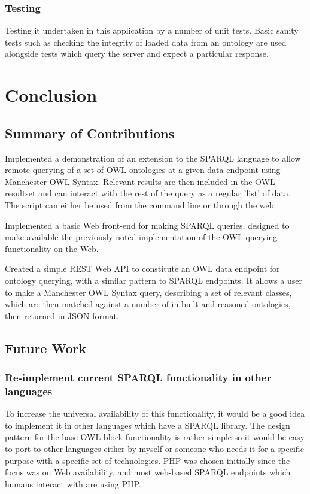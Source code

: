 \documentclass{article}
\begin{document}
\subsubsection{Testing}

Testing it undertaken in this application by a number of unit tests. Basic
sanity tests such as checking the integrity of loaded data from an ontology are
used alongside tests which query the server and expect a particular response.

\section{Conclusion}

\subsection{Summary of Contributions}

Implemented a demonstration of an extension to the SPARQL language to allow
remote querying of a set of OWL ontologies at
a given data endpoint using Manchester OWL Syntax. Relevant results are then
included in the OWL resultset and can
interact with the rest of the query as a regular 'list' of data. The script can
either be used from the command line or
through the web.

Implemented a basic Web front-end for making SPARQL queries, designed to make
available the previously noted implementation of
the OWL querying functionality on the Web.

Created a simple REST Web API to constitute an OWL data endpoint for ontology
querying, with a similar pattern to SPARQL
endpoints. It allows a user to make a Manchester OWL Syntax query, describing a
set of relevant classes, which are then
matched against a number of in-built and reasoned ontologies, then returned in
JSON format.

\subsection{Future Work}

\subsubsection{Re-implement current SPARQL functionality in other languages}

To increase the universal availability of this functionality, it would be a good
idea to implement it in other languages which
have a SPARQL library. The design pattern for the base OWL block functionality
is rather simple so it would be easy to port
to other languages either by myself or someone who needs it for a specific
purpose with a specific set of technologies. PHP
was chosen initially since the focus was on Web availability, and most web-based
SPARQL endpoints which humans interact with
are using PHP.
\end{document}
